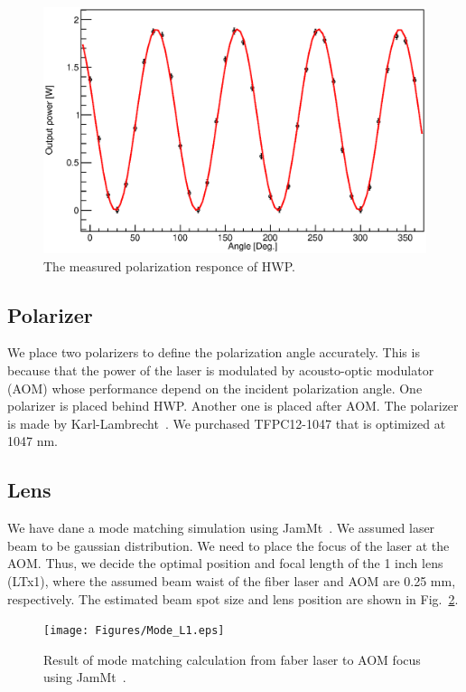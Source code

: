 \begin{figure}
\begin{center}
\includegraphics[width=14cm]{Figures/Pol.eps}
\caption{The measured polarization responce of HWP.} 
\label{fig:Pol} 
\end{center}
\end{figure}

\subsection{Polarizer}
We place two polarizers to define the polarization angle accurately. This is because that the power of the laser is modulated by acousto-optic modulator (AOM) whose performance depend on the incident polarization angle.
One polarizer is placed behind HWP. Another one is placed after AOM. The polarizer is made by Karl-Lambrecht~\cite{Karl_Lambrecht}. We purchased TFPC12-1047 that is optimized at 1047 nm. 

\subsection{Lens}
We have dane a mode matching simulation using JamMt~\cite{JamMt}. We assumed laser beam to be gaussian distribution. We need to place the focus of the laser at the AOM. Thus, we decide the optimal position and focal length of the 1 inch lens (LTx1), where the assumed beam waist of the fiber laser and AOM are 0.25 mm, respectively. The estimated beam spot size and lens position are shown in Fig.~\ref{fig:Mode_L1}.
\begin{figure}
\begin{center}
\texttt{[image: Figures/Mode\_L1.eps]}
\caption{Result of mode matching calculation from faber laser to AOM focus using JamMt~\cite{JamMt}.} 
\label{fig:Mode_L1} 
\end{center}
\end{figure}

